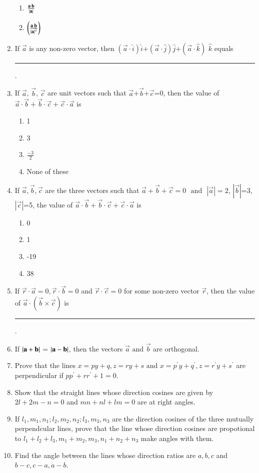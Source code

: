 \begin{enumerate}[label=\thesubsection.\arabic*,ref=\thesubsection.\theenumi]
\begin{enumerate}
\item $\frac{\mathbf{a}\cdot\mathbf{b}}{\left\vert\mathbf{a}\right\vert}$
\item $\left(\frac{\mathbf{a}\cdot\mathbf{b}}{\left\vert\mathbf{a}\right\vert^2}\right)$
\end{enumerate}
\item If $\vec{a}$ is  any non-zero vector, then $(\vec{a}\cdot \hat{i})\hat{i}$+$(\vec{a}\cdot \hat{j})\hat{j}$+$(\vec{a}\cdot \hat{k})$ $\hat{k}$ equals \rule{1cm}{0.15mm}.
\item If $\vec{a}$, $\vec{b}$, $\vec{c}$ are unit vectors such that $\vec{a}$+$\vec{b}$+$\vec{c}$=0, then the value of $\vec{a} \cdot \vec{b}+\vec{b} \cdot \vec{c}+\vec{c} \cdot \vec{a}$ is
	\begin{enumerate}
\item 1
\item 3
\item $\frac{-3}{2}$
\item None of these
\end{enumerate}
\item If $\vec{a},\vec{b},\vec{c}$ are the three vectors such that $\vec{a}+\vec{b}+\vec{c}=0$ $\text{ and }$ $|\vec{a}|=2$, $|\vec{b}|$=3, $|\vec{c}|$=5, the value of $\vec{a} \cdot \vec{b}+\vec{b} \cdot \vec{c}+\vec{c} \cdot \vec{a}$ is
	\begin{enumerate}
\item 0
\item 1	
\item -19
\item 38
\end{enumerate}
\item If $\vec{r}\cdot\vec{a}=0, \vec{r}\cdot\vec{b}=0$ and $\vec{r}\cdot\vec{c}=0$ for some non-zero vector $\vec{r}$, then the value of $\vec{a}\cdot(\vec{b}\times\vec{c})$ is \rule{1cm}{0.15mm}.
\item If $\left\vert\mathbf{a}+\mathbf{b}\right\vert$ = $\left\vert\mathbf{a}-\mathbf{b}\right\vert$, then the vectors $\vec{a}$ $\text {and}$ $\vec{b}$ are orthogonal.
\item Prove that the lines $x=py+q , z=ry+s \text{ and } x=p^{\prime}y+q^{\prime}, z=r^{\prime}y+s^{\prime} $ are perpendicular if $pp^{\prime}+rr^{\prime}+1=0$.
\item Show that the straight lines whose direction cosines are given by $2l+2m-n=0$ and $mn+nl+lm=0$ are at right angles.
\item If $l_1, m_1, n_1;l_2, m_2, n_2;l_3, m_3, n_3$ are the direction cosines of the three mutually perpendcular lines, prove that the line whose direction cosines are propotional to $l_1+l_2+l_3 , m_1+m_2,m_3, n_1+n_2+n_3$ make angles with them.
\item
Find the angle between the lines whose direction ratios are $a,b,c$ and $b-c,c-a,a-b$.
\\
\solution

\end{enumerate}
